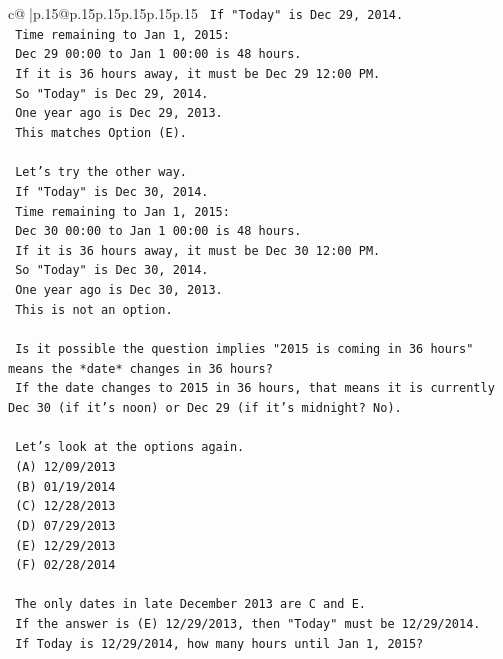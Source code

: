\documentclass{article}
\begin{document}
{\begin{supertabular}{c@{$\;$}|p{.15\linewidth}@{}p{.15\linewidth}p{.15\linewidth}p{.15\linewidth}p{.15\linewidth}p{.15\linewidth}}
{{{\texttt{    If "Today" is Dec 29, 2014.} \\
\texttt{    Time remaining to Jan 1, 2015:} \\
\texttt{    Dec 29 00:00 to Jan 1 00:00 is 48 hours.} \\
\texttt{    If it is 36 hours away, it must be Dec 29 12:00 PM.} \\
\texttt{    So "Today" is Dec 29, 2014.} \\
\texttt{    One year ago is Dec 29, 2013.} \\
\texttt{    This matches Option (E).} \\
\\ 
\texttt{    Let's try the other way.} \\
\texttt{    If "Today" is Dec 30, 2014.} \\
\texttt{    Time remaining to Jan 1, 2015:} \\
\texttt{    Dec 30 00:00 to Jan 1 00:00 is 48 hours.} \\
\texttt{    If it is 36 hours away, it must be Dec 30 12:00 PM.} \\
\texttt{    So "Today" is Dec 30, 2014.} \\
\texttt{    One year ago is Dec 30, 2013.} \\
\texttt{    This is not an option.} \\
\\ 
\texttt{    Is it possible the question implies "2015 is coming in 36 hours" means the *date* changes in 36 hours?} \\
\texttt{    If the date changes to 2015 in 36 hours, that means it is currently Dec 30 (if it's noon) or Dec 29 (if it's midnight? No).} \\
\\ 
\texttt{    Let's look at the options again.} \\
\texttt{    (A) 12/09/2013} \\
\texttt{    (B) 01/19/2014} \\
\texttt{    (C) 12/28/2013} \\
\texttt{    (D) 07/29/2013} \\
\texttt{    (E) 12/29/2013} \\
\texttt{    (F) 02/28/2014} \\
\\ 
\texttt{    The only dates in late December 2013 are C and E.} \\
\texttt{    If the answer is (E) 12/29/2013, then "Today" must be 12/29/2014.} \\
\texttt{    If Today is 12/29/2014, how many hours until Jan 1, 2015?} \\
}}}
\end{supertabular}}
\end{document}
